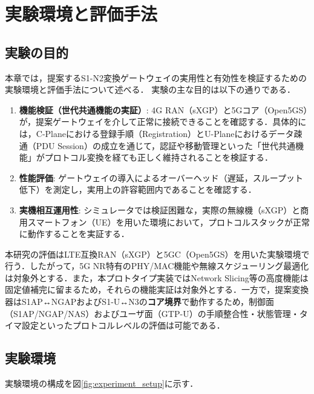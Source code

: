 \chapter{実験環境と評価手法}
\label{chap:experiment}

\section{実験の目的}
本章では，提案するS1-N2変換ゲートウェイの実用性と有効性を検証するための実験環境と評価手法について述べる．
実験の主な目的は以下の通りである．

\begin{enumerate}
    \item \textbf{機能検証（世代共通機能の実証）}: 4G RAN（sXGP）と5Gコア（Open5GS）が，提案ゲートウェイを介して正常に接続できることを確認する．具体的には，C-Planeにおける登録手順（Registration）とU-Planeにおけるデータ疎通（PDU Session）の成立を通じて，認証や移動管理といった「世代共通機能」がプロトコル変換を経ても正しく維持されることを検証する．
    \item \textbf{性能評価}: ゲートウェイの導入によるオーバーヘッド（遅延，スループット低下）を測定し，実用上の許容範囲内であることを確認する．
    \item \textbf{実機相互運用性}: シミュレータでは検証困難な，実際の無線機（sXGP）と商用スマートフォン（UE）を用いた環境において，プロトコルスタックが正常に動作することを実証する．
\end{enumerate}

本研究の評価はLTE互換RAN（sXGP）と5GC（Open5GS）を用いた実験環境で行う．したがって，5G NR特有のPHY/MAC機能や無線スケジューリング最適化は対象外とする．また，本プロトタイプ実装ではNetwork Slicing等の高度機能は固定値補完に留まるため，それらの機能実証は対象外とする．一方で，提案変換器はS1AP↔NGAPおよびS1-U↔N3の\textbf{コア境界}で動作するため，制御面（S1AP/NGAP/NAS）およびユーザ面（GTP-U）の手順整合性・状態管理・タイマ設定といったプロトコルレベルの評価は可能である．

\section{実験環境}
実験環境の構成を図\ref{fig:experiment_setup}に示す．

